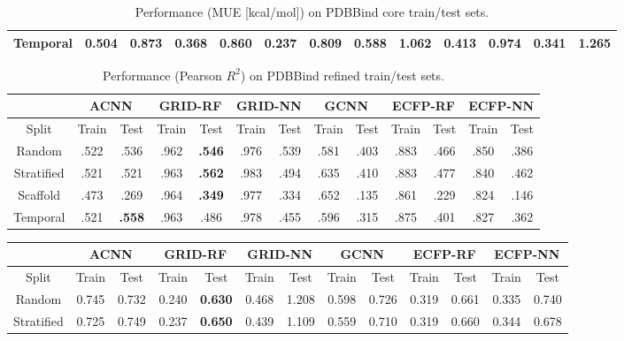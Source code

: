 {\begin{landscape}
\begin{table}[h]
\begin{tabular}{|c||c|c||c|c||c|c||c|c||c|c||c|c|}
    Temporal & 0.504 & 0.873 & 0.368 & \textbf{0.860} & 0.237 & 0.809 & 0.588 & 1.062 & 0.413 & 0.974 & 0.341 & 1.265 \\
    \hline
    \end{tabular}
  \caption{Performance (MUE [kcal/mol]) on PDBBind core train/test sets.}
  \label{tab:core-mae}
\end{table}
\begin{table}[h]
  \centering
    \begin{tabular}{|c||c|c||c|c||c|c||c|c||c|c||c|c|}
    \hline
    \multicolumn{1}{|c||}{} & \multicolumn{2}{c||}{ACNN} & \multicolumn{2}{c||}{GRID-RF} & \multicolumn{2}{c||}{GRID-NN} & \multicolumn{2}{c||}{GCNN} & \multicolumn{2}{c||}{ECFP-RF} & \multicolumn{2}{c|}{ECFP-NN}\\
    \hline
    \hline
    Split & Train & Test & Train & Test & Train & Test & Train & Test & Train & Test & Train & Test \\
    \hline
    Random & .522 & .536 & .962 & \textbf{.546} & .976 & .539 & .581 & .403 & .883 & .466 & .850 & .386 \\
    Stratified & .521 & .521 & .963 & \textbf{.562} & .983 & .494 & .635 & .410 & .883 & .477 & .840 & .462 \\
    Scaffold & .473 & .269 & .964 & \textbf{.349} & .977 & .334 & .652 & .135 & .861 & .229 & .824 & .146 \\
    Temporal & .521 & \textbf{.558} & .963 & .486 & .978 & .455 & .596 & .315 & .875 & .401 & .827 & .362 \\
    \hline
    \end{tabular}
  \caption{Performance (Pearson $R^2$) on PDBBind refined train/test sets.}
  \label{tab:refined-pearson}
\end{table}
\begin{table}[h]
  \centering
    \begin{tabular}{|c||c|c||c|c||c|c||c|c||c|c||c|c|}
    \hline
    \multicolumn{1}{|c||}{} & \multicolumn{2}{c||}{ACNN} & \multicolumn{2}{c||}{GRID-RF} & \multicolumn{2}{c||}{GRID-NN} & \multicolumn{2}{c||}{GCNN} & \multicolumn{2}{c||}{ECFP-RF} & \multicolumn{2}{c|}{ECFP-NN}\\
    \hline
    \hline
    Split & Train & Test & Train & Test & Train & Test & Train & Test & Train & Test & Train & Test \\
    \hline
    Random & 0.745 & 0.732 & 0.240 & \textbf{0.630} & 0.468 & 1.208 & 0.598 & 0.726 & 0.319 & 0.661 & 0.335 & 0.740 \\
    Stratified & 0.725 &  0.749 & 0.237 & \textbf{0.650} & 0.439 & 1.109 & 0.559 & 0.710 & 0.319 & 0.660 & 0.344 & 0.678 \\

\end{tabular}
\end{table}
\end{landscape}}
